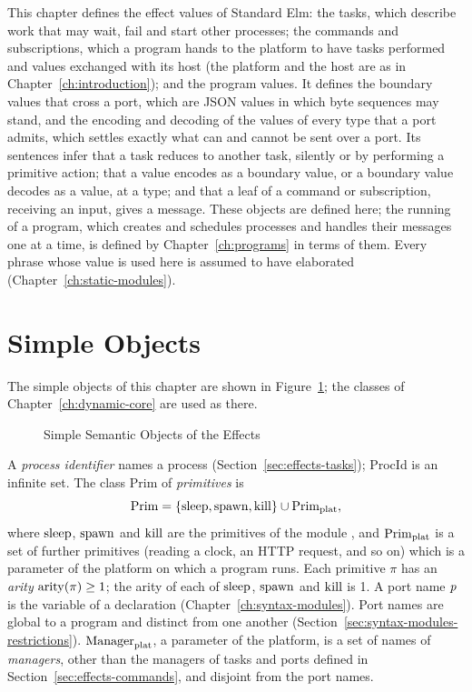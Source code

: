 This chapter defines the effect values of Standard Elm: the tasks, which
describe work that may wait, fail and start other processes; the commands and
subscriptions, which a program hands to the platform to have tasks performed
and values exchanged with its host (the platform and the host are as in
Chapter~\ref{ch:introduction}); and the program values. %
It defines the boundary values that cross a port, which are JSON values in
which byte sequences may stand, and the encoding and decoding of the values of
every type that a port admits, which settles exactly what can and cannot be
sent over a port. %
Its sentences infer that a task reduces to another task, silently or by
performing a primitive action; that a value encodes as a boundary value, or a
boundary value decodes as a value, at a type; and that a leaf of a command or
subscription, receiving an input, gives a message. These objects are
defined here; the running of a program, which creates and schedules processes
and handles their messages one at a time, is defined by
Chapter~\ref{ch:programs} in terms of them.
Every phrase whose value is used here is assumed to have elaborated
(Chapter~\ref{ch:static-modules}). %

\section{Simple Objects}\label{sec:effects-simple}

The simple objects of this chapter are shown in
Figure~\ref{fig:effects-simple}; the classes of Chapter~\ref{ch:dynamic-core}
are used as there.

\begin{figure}[htbp]
\centering
\begin{objtable}
\end{objtable}
\caption{Simple Semantic Objects of the Effects}
\label{fig:effects-simple}
\end{figure}

A \emph{process identifier} names a process (Section~\ref{sec:effects-tasks});
ProcId is an infinite set. The class Prim of \emph{primitives} is
\[
  \mathrm{Prim}=\{\mathrm{sleep},\mathrm{spawn},\mathrm{kill}\}\cup\mathrm{Prim}_{\mathrm{plat}} ,
\]
where $\mathrm{sleep}$, $\mathrm{spawn}$ and $\mathrm{kill}$ are the primitives of the module
, and $\mathrm{Prim}_{\mathrm{plat}}$ is a set of further primitives (reading a
clock, an HTTP request, and so on) which is a parameter of the platform on
which a program runs. %
Each primitive $\pi$ has an \emph{arity} $\mathrm{arity}(\pi)\geq 1$; the arity of
each of $\mathrm{sleep}$, $\mathrm{spawn}$ and $\mathrm{kill}$ is 1.
A port name $\mathit{p}$ is the variable of a  declaration
(Chapter~\ref{ch:syntax-modules}). Port names are global to a program and
distinct from one another (Section~\ref{sec:syntax-modules-restrictions}). %
$\mathrm{Manager}_{\mathrm{plat}}$, a parameter of the platform, is a set of names of
\emph{managers}, other than the managers of tasks and ports defined in
Section~\ref{sec:effects-commands}, and disjoint from the port names. %

